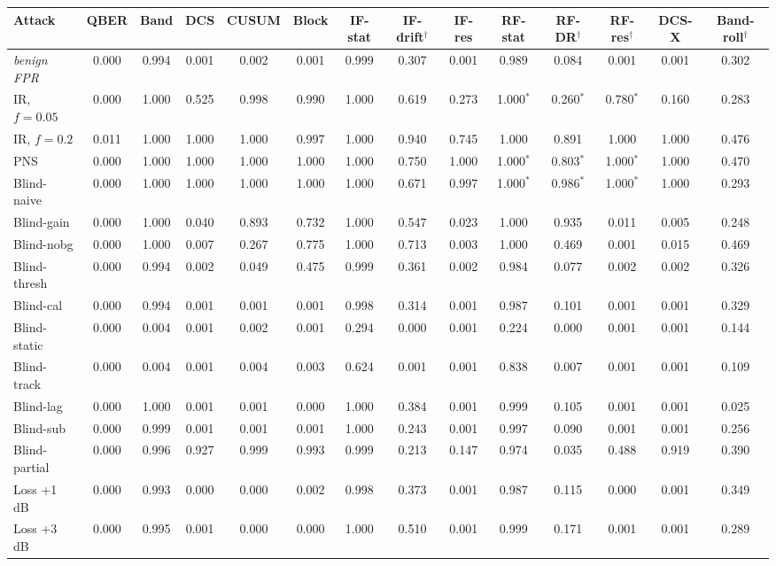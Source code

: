 \begin{tabular}{lccccccccccccc}
\hline
Attack & QBER & Band & DCS & CUSUM & Block & IF-stat & IF-drift$^\dagger$ & IF-res & RF-stat & RF-DR$^\dagger$ & RF-res$^\dagger$ & DCS-X & Band-roll$^\dagger$\\
\hline
\emph{benign FPR} & 0.000 & 0.994 & 0.001 & 0.002 & 0.001 & 0.999 & 0.307 & 0.001 & 0.989 & 0.084 & 0.001 & 0.001 & 0.302\\
IR, $f=0.05$ & 0.000 & 1.000 & 0.525 & 0.998 & 0.990 & 1.000 & 0.619 & 0.273 & 1.000$^*$ & 0.260$^*$ & 0.780$^*$ & 0.160 & 0.283\\
IR, $f=0.2$ & 0.011 & 1.000 & 1.000 & 1.000 & 0.997 & 1.000 & 0.940 & 0.745 & 1.000 & 0.891 & 1.000 & 1.000 & 0.476\\
PNS & 0.000 & 1.000 & 1.000 & 1.000 & 1.000 & 1.000 & 0.750 & 1.000 & 1.000$^*$ & 0.803$^*$ & 1.000$^*$ & 1.000 & 0.470\\
Blind-naive & 0.000 & 1.000 & 1.000 & 1.000 & 1.000 & 1.000 & 0.671 & 0.997 & 1.000$^*$ & 0.986$^*$ & 1.000$^*$ & 1.000 & 0.293\\
Blind-gain & 0.000 & 1.000 & 0.040 & 0.893 & 0.732 & 1.000 & 0.547 & 0.023 & 1.000 & 0.935 & 0.011 & 0.005 & 0.248\\
Blind-nobg & 0.000 & 1.000 & 0.007 & 0.267 & 0.775 & 1.000 & 0.713 & 0.003 & 1.000 & 0.469 & 0.001 & 0.015 & 0.469\\
Blind-thresh & 0.000 & 0.994 & 0.002 & 0.049 & 0.475 & 0.999 & 0.361 & 0.002 & 0.984 & 0.077 & 0.002 & 0.002 & 0.326\\
Blind-cal & 0.000 & 0.994 & 0.001 & 0.001 & 0.001 & 0.998 & 0.314 & 0.001 & 0.987 & 0.101 & 0.001 & 0.001 & 0.329\\
Blind-static & 0.000 & 0.004 & 0.001 & 0.002 & 0.001 & 0.294 & 0.000 & 0.001 & 0.224 & 0.000 & 0.001 & 0.001 & 0.144\\
Blind-track & 0.000 & 0.004 & 0.001 & 0.004 & 0.003 & 0.624 & 0.001 & 0.001 & 0.838 & 0.007 & 0.001 & 0.001 & 0.109\\
Blind-lag & 0.000 & 1.000 & 0.001 & 0.001 & 0.000 & 1.000 & 0.384 & 0.001 & 0.999 & 0.105 & 0.001 & 0.001 & 0.025\\
Blind-sub & 0.000 & 0.999 & 0.001 & 0.001 & 0.001 & 1.000 & 0.243 & 0.001 & 0.997 & 0.090 & 0.001 & 0.001 & 0.256\\
Blind-partial & 0.000 & 0.996 & 0.927 & 0.999 & 0.993 & 0.999 & 0.213 & 0.147 & 0.974 & 0.035 & 0.488 & 0.919 & 0.390\\
Loss +1 dB & 0.000 & 0.993 & 0.000 & 0.000 & 0.002 & 0.998 & 0.373 & 0.001 & 0.987 & 0.115 & 0.000 & 0.001 & 0.349\\
Loss +3 dB & 0.000 & 0.995 & 0.001 & 0.000 & 0.000 & 1.000 & 0.510 & 0.001 & 0.999 & 0.171 & 0.001 & 0.001 & 0.289\\
\hline
\end{tabular}